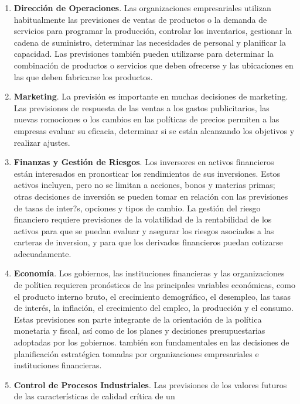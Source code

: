 \documentclass[12pt,]{krantz}
\theoremstyle{definition}
\theoremstyle{definition}
\theoremstyle{definition}
\theoremstyle{remark}
\begin{document}
\begin{enumerate}
\def\labelenumi{\arabic{enumi})}
\item
  \textbf{Dirección de Operaciones}. Las organizaciones empresariales
  utilizan habitualmente las previsiones de ventas de productos o la
  demanda de servicios para programar la producción, controlar los
  inventarios, gestionar la cadena de suministro, determinar las
  necesidades de personal y planificar la capacidad. Las previsiones
  también pueden utilizarse para determinar la combinación de productos
  o servicios que deben ofrecerse y las ubicaciones en las que deben
  fabricarse los productos.
\item
  \textbf{Marketing}. La previsión es importante en muchas decisiones de
  marketing. Las previsiones de respuesta de las ventas a los gastos
  publicitarios, las nuevas romociones o los cambios en las políticas de
  precios permiten a las empresas evaluar su eficacia, determinar si se
  están alcanzando los objetivos y realizar ajustes.
\item
  \textbf{Finanzas y Gestión de Riesgos}. Los inversores en activos
  financieros están interesados en pronosticar los rendimientos de sus
  inversiones. Estos activos incluyen, pero no se limitan a acciones,
  bonos y materias primas; otras decisiones de inversión se pueden tomar
  en relación con las previsiones de tasas de inter?s, opciones y tipos
  de cambio. La gestión del riesgo financiero requiere previsiones de la
  volatilidad de la rentabilidad de los activos para que se puedan
  evaluar y asegurar los riesgos asociados a las carteras de inversion,
  y para que los derivados financieros puedan cotizarse adecuadamente.
\item
  \textbf{Economía}. Los gobiernos, las instituciones financieras y las
  organizaciones de política requieren pronósticos de las principales
  variables económicas, como el producto interno bruto, el crecimiento
  demográfico, el desempleo, las tasas de interés, la inflación, el
  crecimiento del empleo, la producción y el consumo. Estas previsiones
  son parte integrante de la orientación de la política monetaria y
  fiscal, así como de los planes y decisiones presupuestarias adoptadas
  por los gobiernos. también son fundamentales en las decisiones de
  planificación estratégica tomadas por organizaciones empresariales e
  instituciones financieras.
\item
  \textbf{Control de Procesos Industriales}. Las previsiones de los
  valores futuros de las características de calidad crítica de un

\end{enumerate}
\end{document}
